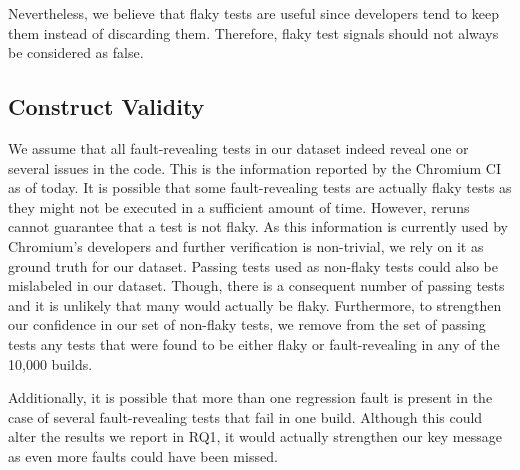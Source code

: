 Nevertheless, we believe that flaky tests are useful since developers tend to keep them instead of discarding them. Therefore, flaky test signals should not always be considered as false. 

\subsection{Construct Validity}
We assume that all fault-revealing tests in our dataset indeed reveal one or several issues in the code. This is the information reported by the Chromium CI as of today. It is possible that some fault-revealing tests are actually flaky tests as they might not be executed in a sufficient amount of time. However, reruns cannot guarantee that a test is not flaky. As this information is currently used by Chromium's developers and further verification is non-trivial, we rely on it as ground truth for our dataset. Passing tests used as non-flaky tests could also be mislabeled in our dataset. Though, there is a consequent number of passing tests and it is unlikely that many would actually be flaky. Furthermore, to strengthen our confidence in our set of non-flaky tests, we remove from the set of passing tests any tests that were found to be either flaky or fault-revealing in any of the 10,000 builds.

Additionally, it is possible that more than one regression fault is present in the case of several fault-revealing tests that fail in one build. Although this could alter the results we report in RQ1, it would actually strengthen our key message as even more faults could have been missed.